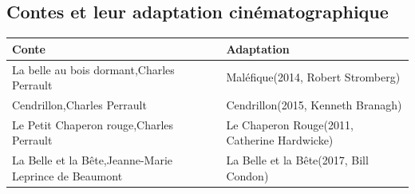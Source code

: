 \documentclass[
  10pt,
  french,
  a5paper,
  openany]{book}
\begin{document}
\hypertarget{contes-et-leur-adaptation-cinuxe9matographique}{%
\subsection*{Contes et leur adaptation cinématographique}\label{contes-et-leur-adaptation-cinuxe9matographique}}

\begin{longtable}[]{@{}ll@{}}
\toprule
\begin{minipage}[b]{0.51\columnwidth}\raggedright
Conte\strut
\end{minipage} & \begin{minipage}[b]{0.43\columnwidth}\raggedright
Adaptation\strut
\end{minipage}\tabularnewline
\midrule
\endhead
\begin{minipage}[t]{0.51\columnwidth}\raggedright
La belle au bois dormant,\linebreak Charles Perrault\strut
\end{minipage} & \begin{minipage}[t]{0.43\columnwidth}\raggedright
Maléfique\linebreak (2014, Robert Stromberg)\strut
\end{minipage}\tabularnewline
\begin{minipage}[t]{0.51\columnwidth}\raggedright
Cendrillon,\linebreak Charles Perrault\strut
\end{minipage} & \begin{minipage}[t]{0.43\columnwidth}\raggedright
Cendrillon\linebreak (2015, Kenneth Branagh)\strut
\end{minipage}\tabularnewline
\begin{minipage}[t]{0.51\columnwidth}\raggedright
Le Petit Chaperon rouge,\linebreak Charles Perrault\strut
\end{minipage} & \begin{minipage}[t]{0.43\columnwidth}\raggedright
Le Chaperon Rouge\linebreak (2011, Catherine Hardwicke)\strut
\end{minipage}\tabularnewline
\begin{minipage}[t]{0.51\columnwidth}\raggedright
La Belle et la Bête,\linebreak Jeanne-Marie Leprince de Beaumont\strut
\end{minipage} & \begin{minipage}[t]{0.43\columnwidth}\raggedright
La Belle et la Bête\linebreak (2017, Bill Condon)\strut
\end{minipage}\tabularnewline
\bottomrule
\end{longtable}
\end{document}
